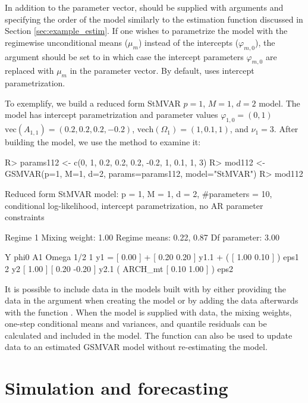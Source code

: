 \documentclass[nojss]{jss}
\begin{document}
In addition to the parameter vector,  should be supplied with arguments  and  specifying the order of the model similarly to the estimation function  discussed in Section \ref{sec:example_estim}. If one wishes to parametrize the model with the regimewise unconditional means ($\mu_m$) instead of the intercepts ($\varphi_{m,0}$), the argument  should be set to  in which case the intercept parameters $\varphi_{m,0}$ are replaced with $\mu_m$ in the parameter vector. By default,  uses intercept parametrization.

To exemplify, we build a reduced form StMVAR $p=1$, $M=1$, $d=2$ model. The model has intercept parametrization and parameter values $\varphi_{1,0}=(0, 1)$ $\text{vec}(A_{1,1}) = (0.2, 0.2, 0.2, -0.2)$, $\text{vech}(\Omega_1) = (1, 0.1, 1)$, and $\nu_1 = 3$. After building the model, we use the  method to examine it:
%
\begin{CodeChunk}
\begin{CodeInput}
R> params112 <- c(0, 1, 0.2, 0.2, 0.2, -0.2, 1, 0.1, 1, 3)
R> mod112 <- GSMVAR(p=1, M=1, d=2, params=params112, model="StMVAR")
R> mod112
\end{CodeInput}
\begin{CodeOutput}
Reduced form StMVAR model:
 p = 1, M = 1, d = 2, #parameters = 10,
 conditional log-likelihood, intercept parametrization, no AR parameter
 constraints

Regime 1
Mixing weight: 1.00
Regime means: 0.22, 0.87
Df parameter:  3.00

   Y     phi0          A1                            Omega          1/2
1 y1 = [ 0.00 ] + [  0.20  0.20 ] y1.1 + (         [  1.00 0.10 ] )     eps1
2 y2   [ 1.00 ]   [  0.20 -0.20 ] y2.1   ( ARCH_mt [  0.10 1.00 ] )     eps2
\end{CodeOutput}
\end{CodeChunk}
%

It is possible to include data in the models built with  by either providing the data in the argument  when creating the model or by adding the data afterwards with the function . When the model is supplied with data, the mixing weights, one-step conditional means and variances, and quantile residuals can be calculated and included in the model. The function  can also be used to update data to an estimated GSMVAR model without re-estimating the model.

\section{Simulation and forecasting}\label{sec:simufore}
\end{document}
